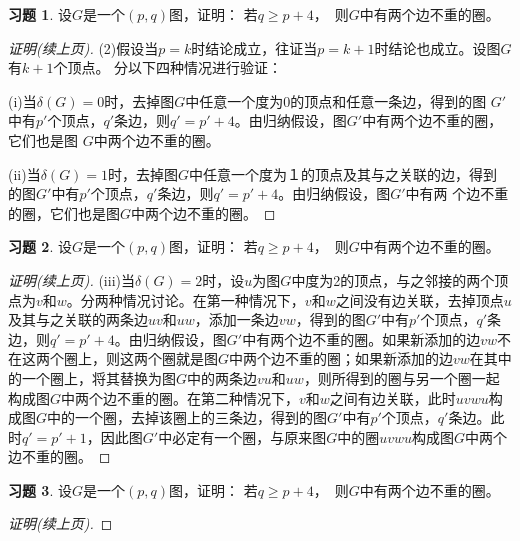 \documentclass{beamer}
\theoremstyle{definition}
\theoremstyle{example}
\newtheorem*{Exercise1}{习题}
\begin{document}
\begin{CJK*}{UTF8}{gbsn}
\begin{frame}
\end{frame}

\begin{frame}
    \begin{Exercise1}
    设$G$是一个$(p,q)$图，证明：
    若$q \geq p + 4$，　则$G$中有两个边不重的圈。
  \end{Exercise1}
  \begin{proof}[证明(续上页)]

    (2)假设当$p = k$时结论成立，往证当$p = k+1$时结论也成立。设图$G$有$k+1$个顶点。
    分以下四种情况进行验证：

    
    (i)当$\delta(G)=0$时，去掉图$G$中任意一个度为0的顶点和任意一条边，得到的图
    $G'$中有$p'$个顶点，$q'$条边，则$q'=p'+4$。由归纳假设，图$G'$中有两个边不重的圈，它们也是图
    $G$中两个边不重的圈。

    (ii)当$\delta(G)=1$时，去掉图$G$中任意一个度为１的顶点及其与之关联的边，得到
    的图$G'$中有$p'$个顶点，$q'$条边，则$q' = p' + 4$。由归纳假设，图$G'$中有两
    个边不重的圈，它们也是图$G$中两个边不重的圈。

  \end{proof}

\end{frame}

\begin{frame}
    \begin{Exercise1}
    设$G$是一个$(p,q)$图，证明：
    若$q \geq p + 4$，　则$G$中有两个边不重的圈。
  \end{Exercise1}
  \begin{proof}[证明(续上页)]


    (iii)当$\delta(G)=2$时，设$u$为图$G$中度为2的顶点，与之邻接的两个顶点为$v$和$w$。分两种情况讨论。在第一种情况下，$v$和$w$之间没有边关联，去掉顶点$u$及其与之关联的两条边$uv$和$uw$，添加一条边$vw$，得到的图$G'$中有$p'$个顶点，$q'$条边，则$q'=p'+4$。由归纳假设，图$G'$中有两个边不重的圈。如果新添加的边$vw$不在这两个圈上，则这两个圈就是图$G$中两个边不重的圈；如果新添加的边$vw$在其中的一个圈上，将其替换为图$G$中的两条边$vu$和$uw$，则所得到的圈与另一个圈一起构成图$G$中两个边不重的圈。在第二种情况下，$v$和$w$之间有边关联，此时$uvwu$构成图$G$中的一个圈，去掉该圈上的三条边，得到的图$G'$中有$p'$个顶点，$q'$条边。此时$q'=p'+1$，因此图$G'$中必定有一个圈，与原来图$G$中的圈$uvwu$构成图$G$中两个边不重的圈。
  \end{proof}

\end{frame}

\begin{frame}
    \begin{Exercise1}
    设$G$是一个$(p,q)$图，证明：
    若$q \geq p + 4$，　则$G$中有两个边不重的圈。
  \end{Exercise1}
  \begin{proof}[证明(续上页)]



\end{proof}
\end{frame}
\end{CJK*}
\end{document}
